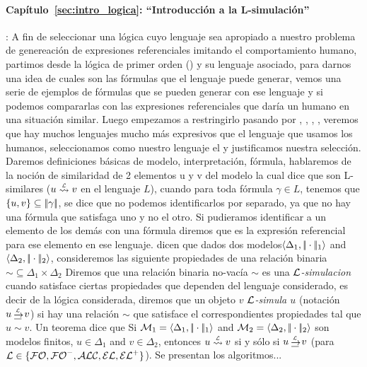 \paragraph{Cap\'itulo~\ref{sec:intro_logica}: ``Introducci\'on a la L-simulaci\'on''}: A fin de seleccionar una l\'ogica cuyo lenguaje sea apropiado a nuestro problema de 
genereaci\'on de expresiones referenciales imitando el comportamiento humano, partimos desde la l\'ogica de primer orden (\FOL) y su lenguaje 
asociado, para darnos una idea de cuales son las f\'ormulas que el lenguaje puede generar, vemos una serie de ejemplos de f\'ormulas que se 
pueden generar con ese lenguaje y si podemos compararlas con las expresiones referenciales que dar\'ia un humano en una situaci\'on similar. 
Luego empezamos a restringirlo pasando por \EPFOL, \ALC, \EL, \ELAN, veremos que hay muchos lenguajes mucho m\'as expresivos que el lenguaje 
que usamos los humanos, seleccionamos como nuestro lenguaje el \EL y justificamos nuestra selecci\'on. Daremos definiciones b\'asicas de 
modelo, interpretaci\'on, f\'ormula, hablaremos de la noci\'on de similaridad de 2 elementos u y v del modelo la cual dice que son 
L-similares ($u \simil{\+L} v$ en el lenguaje $L$), cuando para toda f\'ormula $\gamma \in L$, tenemos que $\{u,v\} \subseteq 
|\!|\gamma|\!|$, se dice que no podemos identificarlos por separado, ya que no hay una f\'ormula que satisfaga uno y no el otro. 
Si pudieramos identificar a un elemento de los dem\'as con una f\'ormula diremos que es la expresi\'on referencial para ese elemento en ese 
lenguaje. \cite{arec:usin11} dicen que dados dos modelos$\langle \Delta_1, |\!|\cdot|\!|_1 \rangle$ and $\langle \Delta_2,
|\!|\cdot|\!|_2 \rangle$, consideremos las siguiente
propiedades de una relaci\'on binaria ${\sim} \subseteq \Delta_1 \times \Delta_2$ Diremos que una relaci\'on binaria no-vac\'ia $\sim$ es una 
\emph{$\mathcal{L}$-simulacion} cuando satisface ciertas propiedades que dependen del lenguaje considerado, es decir de la l\'ogica considerada, 
diremos que un objeto
\emph{$v$ $\mathcal{L}$-simula $u$} (notaci\'on $u \simul{\+L} v$) si hay una relaci\'on $\sim$ que satisface el correspondientes propiedades tal que
$u \sim v$. Un teorema dice que Si $\mathcal{M}_1 = \langle \Delta_1, |\!|\cdot|\!|_1 \rangle$ and $\mathcal{M}_2 =
\langle \Delta_2, |\!|\cdot|\!|_2 \rangle$ son modelos finitos, $u \in \Delta_1$ and $v \in \Delta_2$, entonces $u \simil{\+L} v$ si y s\'olo si 
$u \simul{\+L} v$ (para $\mathcal{L} \in \{\mathcal{FO},{\mathcal{FO}^-},\mathcal{ALC},\mathcal{EL},{\mathcal{EL}^+}\}$). Se presentan los algoritmos...


